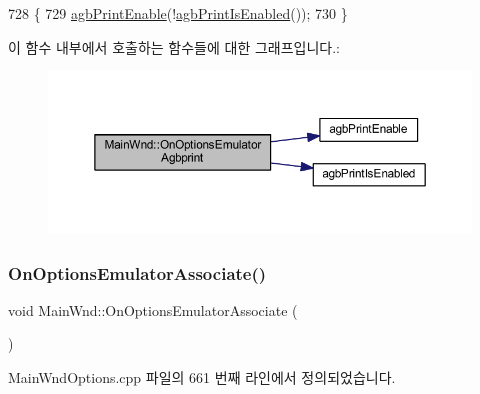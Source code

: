 \begin{DoxyCode}
728 \{
729   \mbox{\hyperlink{agbprint_8cpp_a2c1eb14a0b2362011cc1aac05a1e5902}{agbPrintEnable}}(!\mbox{\hyperlink{agbprint_8cpp_ab6b9c9b8eb5e971359941e3b4923ced9}{agbPrintIsEnabled}}());
730 \}
\end{DoxyCode}
이 함수 내부에서 호출하는 함수들에 대한 그래프입니다.\+:
\nopagebreak
\begin{figure}[H]
\begin{center}
\leavevmode
\includegraphics[width=350pt]{class_main_wnd_ac4ff3f77ecc063505ba2565d5f54277b_cgraph}
\end{center}
\end{figure}
\mbox{\label{class_main_wnd_a824b678e28dacab4a43b4ac0918e8555}} 
\subsubsection{\texorpdfstring{On\+Options\+Emulator\+Associate()}{OnOptionsEmulatorAssociate()}}
{\footnotesize\ttfamily void Main\+Wnd\+::\+On\+Options\+Emulator\+Associate (\begin{DoxyParamCaption}{ }\end{DoxyParamCaption})\hspace{0.3cm}{\ttfamily [protected]}}



Main\+Wnd\+Options.\+cpp 파일의 661 번째 라인에서 정의되었습니다.



